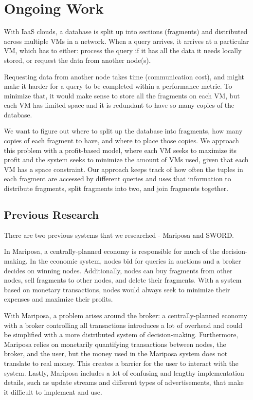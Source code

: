 \documentclass{brandiss}
\numberwithin{section}{chapter}
\numberwithin{figure}{chapter}
\theoremstyle{definition}
\theoremstyle{plain}
\theoremstyle{remark}
\begin{document}
\chapter{Ongoing Work}

With IaaS clouds, a database is split up into sections (fragments) and distributed across multiple VMs in a network. When a query arrives, it arrives at a particular VM, which has to either: process the query if it has all the data it needs locally stored, or request the data from another node(s).

Requesting data from another node takes time (communication cost), and might make it harder for a query to be completed within a performance metric. To minimize that, it would make sense to store all the fragments on each VM, but each VM has limited space and it is redundant to have so many copies of the database.

We want to figure out where to split up the database into fragments, how many copies of each fragment to have, and where to place those copies. We approach this problem with a profit-based model, where each VM seeks to maximize its profit and the system seeks to minimize the amount of VMs used, given that each VM has a space constraint. Our approach keeps track of how often the tuples in each fragment are accessed by different queries and uses that information to distribute fragments, split fragments into two, and join fragments together. 

\section{Previous Research}

There are two previous systems that we researched - Mariposa and SWORD.

In Mariposa, a centrally-planned economy is responsible for much of the decision-making. In the economic system, nodes bid for queries in auctions and a broker decides on winning nodes. Additionally, nodes can buy fragments from other nodes, sell fragments to other nodes, and delete their fragments. With a system based on monetary transactions, nodes would always seek to minimize their expenses and maximize their profits.

With Mariposa, a problem arises around the broker: a centrally-planned economy with a broker controlling all transactions introduces a lot of overhead and could be simplified with a more distributed system of decision-making. Furthermore, Mariposa relies on monetarily quantifying transactions between nodes, the broker, and the user, but the money used in the Mariposa system does not translate to real money. This creates a barrier for the user to interact with the system. Lastly, Mariposa includes a lot of confusing and lengthy implementation details, such as update streams and different types of advertisements, that make it difficult to implement and use.
\end{document}
